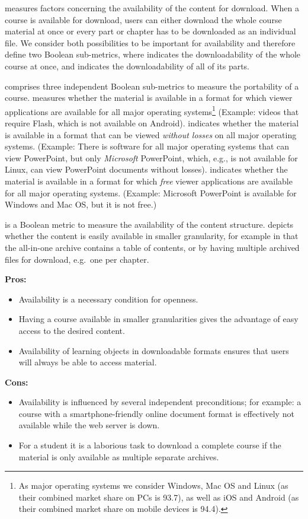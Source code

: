 \documentclass{sig-alternate}
\theoremstyle{definition}
\begin{document}
 measures factors concerning the availability of the content for download.
When a course is available for download, users can either download the whole course material at once or every part or chapter has to be downloaded as an individual file.
We consider both possibilities to be important for availability and therefore define two Boolean sub-metrics, where  indicates the downloadability of the whole course at once, and  indicates the downloadability of all of its parts.


 comprises three independent Boolean sub-metrics to measure the portability of a course.
 measures whether the material is available in a format for which viewer applications are available for all major operating systems\footnote{As major operating systems we consider Windows, Mac OS and Linux (as their combined market share on PCs is 93.7), as well as iOS and Android (as their combined market share on mobile devices is 94.4).}
(Example: videos that require Flash, which is not available on Android).
 indicates whether the material is available in a format that can be viewed \emph{without losses} on all major operating systems.
(Example: There is software for all major operating systems that can view PowerPoint, but only \emph{Microsoft} PowerPoint, which, e.g., is not available for Linux, can view PowerPoint documents without losses).
 indicates whether the material is available in a format for which \emph{free} viewer applications are available for all major operating systems.
(Example: Microsoft PowerPoint is available for Windows and Mac OS, but it is not free.)


 is a Boolean metric to measure the availability of the content structure.
 depicts whether the content is easily available in smaller granularity, for example in that the all-in-one archive contains a table of contents, or by having multiple archived files for download, e.g.\ one per chapter.


\noindent\textbf{Pros:}
\begin{itemize}
\item Availability is a necessary condition for openness.
\item Having a course available in smaller granularities gives the advantage of easy access to the desired content.
\item Availability of learning objects in downloadable formats ensures that users will always be able to access material.
\end{itemize}
\noindent\textbf{Cons:}
\begin{itemize}
\item Availability is influenced by several independent preconditions; for example: a course with a smartphone-friendly online document format is effectively not available while the web server is down.
\item For a student it is a laborious task to download a complete course if the material is only available as multiple separate archives.
\end{itemize}
\end{document}
